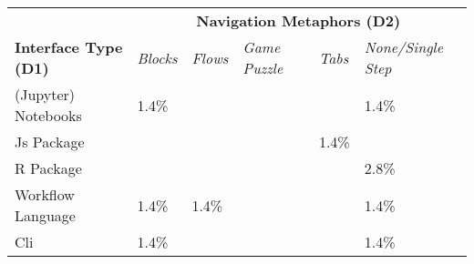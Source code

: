 \begin{tabular}{p{3.5cm}p{2cm}p{2cm}p{2cm}p{2cm}p{2cm}}
\toprule 
& \multicolumn{5}{c}{\textbf{\textcolor{color3}{Navigation Metaphors (D2)}}} \\ \cmidrule{2-6} \textbf{\textcolor{color3}{Interface Type (D1)}} & \textit{Blocks} & \textit{Flows} & \textit{Game Puzzle} & \textit{Tabs} & \textit{None/Single Step}\\ 
\midrule
\noalign{\smallskip}

(Jupyter) Notebooks & 1.4\% \newline \cite{10.1145/3544548.3581424} \cellcolor[cmyk]{0.006308,0.0,0.001492,0.002196} &  &  &  & 1.4\% \newline \cite{10.1145/3491102.3502102} \cellcolor[cmyk]{0.006308,0.0,0.001492,0.002196} \\ 
Js Package &  &  &  & 1.4\% \newline \cite{10.1145/3472749.3474734} \cellcolor[cmyk]{0.006308,0.0,0.001492,0.002196} &  \\ 
R Package &  &  &  &  & 2.8\% \newline \cite{10.1007/978-3-031-26422-1_51, 10.1145/3313831.3376764} \cellcolor[cmyk]{0.012616,0.0,0.002984,0.004392} \\ 
Workflow Language & 1.4\% \newline \cite{10.1145/3209889.3209891} \cellcolor[cmyk]{0.006308,0.0,0.001492,0.002196} & 1.4\% \newline \cite{10.5555/3306127.3331969} \cellcolor[cmyk]{0.006308,0.0,0.001492,0.002196} &  &  & 1.4\% \newline \cite{10.1145/3530800.3534539} \cellcolor[cmyk]{0.006308,0.0,0.001492,0.002196} \\ 
Cli & 1.4\% \newline \cite{10.1145/3332165.3347936} \cellcolor[cmyk]{0.006308,0.0,0.001492,0.002196} &  &  &  & 1.4\% \newline \cite{10.1145/3517207.3526984} \cellcolor[cmyk]{0.006308,0.0,0.001492,0.002196} \\ 

\end{tabular}
